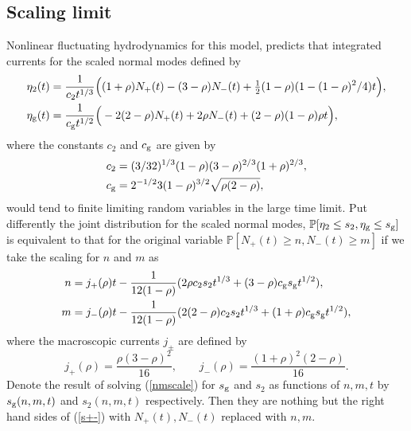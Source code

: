 \documentclass[cmp]{svjour}
\numberwithin{theorem}{section}
\numberwithin{equation}{section}
\begin{document}
\subsection{Scaling limit}\label{sec:Scaling limit}
Nonlinear fluctuating hydrodynamics  \cite{landau2013course,MF1973,SH1977,DM1986} for this model, predicts that integrated currents for the scaled normal modes defined by 
\begin{equation}
\begin{split}
\eta_2(t) &= \frac{1}{c_2 t^{1/3}} \Big( (1+\rho) N_+(t)-(3-\rho) N_-(t)+\tfrac12(1-\rho) (1-(1-\rho)^2/4) t\Big),
\\
\eta_{\rm g}(t) &= \frac{1}{c_{\rm g} t^{1/2}} \Big( -2(2-\rho) N_+(t)+2\rho  N_-(t)+(2-\rho)(1-\rho)\rho t \Big),
\end{split}
\label{s+-}
\end{equation}
where the constants $c_2$ and $c_{\rm g}$ are given by
\begin{equation}
\begin{split}
c_2 &=(3/32)^{1/3}(1-\rho)(3-\rho)^{2/3}(1+\rho)^{2/3},
\\
c_{\rm g} &= 2^{-1/2} 3(1-\rho)^{3/2}\sqrt{\rho(2-\rho)},
\end{split}
\label{c2cg}
\end{equation}
would tend to finite limiting random variables in the large time limit. 
Put differently the joint distribution for the scaled normal modes, $\mathbb{P}[\eta_2 \leq s_2, \eta_{\rm g} \leq s_{\rm g}]$
is equivalent to that 
for the original variable $\mathbb{P}[N_+(t)\geq n, N_-(t)\geq m]$ 
if we take the scaling for $n$ and $m$ as  
\begin{equation}
\begin{split}
n &= j_+(\rho)t -\frac{1}{12(1-\rho)}(2\rho c_2 s_2 t^{1/3}+(3-\rho)c_{\rm g} s_{\rm g} t^{1/2}),
\\
m &= j_-(\rho)t -\frac{1}{12(1-\rho)}(2(2-\rho)c_2 s_2 t^{1/3}+(1+\rho) c_{\rm g} s_{\rm g} t^{1/2}),
\end{split}
\label{nmscale}
\end{equation}
where the macroscopic currents $j_\pm$ are defined by
\begin{equation}
     j_+(\rho) = \frac{\rho(3-\rho)^2}{16}, \qquad j_-(\rho)=\frac{(1+\rho)^2(2-\rho)}{16}.
     \label{jpm}
\end{equation}
Denote the result of solving (\ref{nmscale}) for $s_{\rm g}$ and $s_2$ as functions of $n,m,t$  
by $s_{\rm g}(n,m,t)$ and $s_2(n,m,t)$ respectively. Then they are nothing but the right hand 
sides of (\ref{s+-}) with $N_+(t),N_-(t)$ replaced with $n,m$. 
\end{document}
